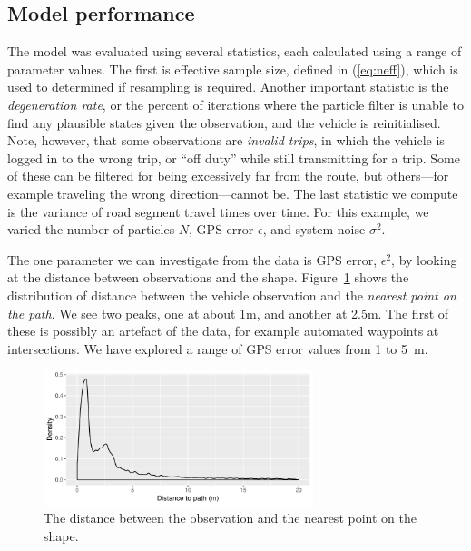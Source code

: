 \subsection{Model performance}
\label{sec:model_perf}


The model was evaluated using several statistics,
each calculated using a range of parameter values.
The first is effective sample size,
defined in (\ref{eq:neff}),
which is used to determined if resampling is required.
Another important statistic is the \emph{degeneration rate},
or the percent of iterations where the particle filter
is unable to find any plausible states given the observation,
and the vehicle is reinitialised.
Note, however, that some observations are \emph{invalid trips},
in which the vehicle is logged in to the wrong trip,
or ``off duty'' while still transmitting for a trip.
Some of these can be filtered for being excessively far from the route,
but others---for example traveling the wrong direction---cannot be.
The last statistic we compute is the variance of road segment travel times
over time.
For this example, we varied the number of particles $N$,
GPS error $\epsilon$, and system noise $\sigma^2$.


The one parameter we can investigate from the data is GPS error, $\epsilon^2$,
by looking at the distance between observations and the shape.
Figure~\ref{fig:dist_to_route} shows the distribution of distance between the vehicle
observation and the \emph{nearest point on the path}.
We see two peaks,
one at about 1m, and another at 2.5m.
The first of these is possibly an artefact of the data,
for example automated waypoints at intersections.
We have explored a range of GPS error values from 1 to 5~m.

\begin{figure}[tb]
    \centering
    \includegraphics[width=0.7\textwidth]{figures/04_model_results_dist.pdf}
    \caption{The distance between the observation and the nearest point on the shape.}
    \label{fig:dist_to_route}
\end{figure}


